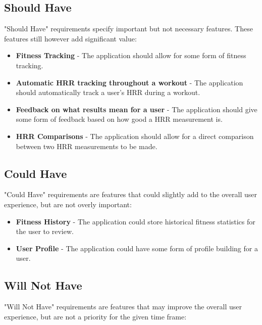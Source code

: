 \documentclass{l4proj}
\begin{document}
\subsection{Should Have}
\label{sec:shouldhave}

"Should Have" requirements specify important but not necessary features. These features still however add significant value:

\begin{itemize}
    \item \textbf{Fitness Tracking} - The application should allow for some form of fitness tracking.
    \item \textbf{Automatic HRR tracking throughout a workout} - The application should automatically track a user's HRR during a workout.
    \item \textbf{Feedback on what results mean for a user} - The application should give some form of feedback based on how good a HRR measurement is.
    \item \textbf{HRR Comparisons} - The application should allow for a direct comparison between two HRR measurements to be made.
    
\end{itemize}

\subsection{Could Have}
\label{sec:couldhave}

"Could Have" requirements are features that could slightly add to the overall user experience, but are not overly important:

\begin{itemize}
    \item \textbf{Fitness History} - The application could store historical fitness statistics for the user to review.
    \item \textbf{User Profile} - The application could have some form of profile building for a user.
\end{itemize}

\subsection{Will Not Have}
\label{sec:willnothave}

"Will Not Have" requirements are features that may improve the overall user experience, but are not a priority for the given time frame:
\end{document}
